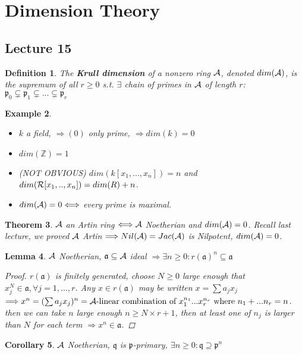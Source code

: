 \documentclass[11pt]{article}
\newtheorem{thm}{Theorem}[section]
\newtheorem{lemma}[thm]{Lemma}
\newtheorem{cor}[thm]{Corollary}
\newtheorem{dfn}[thm]{Definition}
\newtheorem{ex}[thm]{Example}
\newcommand{\intg}{\mathbb Z}
\newcommand{\sca}{{\mathfrak a}}
\newcommand{\scp}{{\mathfrak p}}
\newcommand{\scq}{\mathfrak q}
\newcommand{\cala}{{\cal A}}
\newcommand{\calr}{{\cal R}}
\newcommand{\Lrta}{\Longrightarrow}
\newcommand{\Llrta}{\Longleftrightarrow}
\begin{document}
\section{Dimension Theory}

\subsection{Lecture 15}
\begin{dfn}
The \textbf{Krull dimension} of a nonzero ring $\cala$, denoted $dim(\cala)$, is the supremum of all $r\geq 0$ s.t. $\exists$ chain of primes in $\cala$ of length $r$: 
$\scp_0\subsetneq \scp_1\subsetneq...\subsetneq \scp_r$
\end{dfn}

\begin{ex}\ 
\begin{itemize}
\item $k$ a field, $\Lrta (0)$ only prime, $\Lrta dim(k)=0$
\item $dim(\intg)=1$
\item (NOT OBVIOUS) $dim(k[x_1,...,x_n])=n$
 and $dim(\calr[x_1,..,x_n])=dim(R)+n$.
\item $dim(\cala)=0\Llrta $ every prime is maximal.  
\end{itemize}
\end{ex}

\begin{thm}\label{thm:Artin_equiv_Noetherin+dim=0}
$\cala$ an Artin ring $\Llrta\cala$ Noetherian and $dim(\cala)=0$. Recall last lecture, we proved $\cala$ Artin $\Lrta Nil(\cala)=Jac(\cala)$ is Nilpotent, $dim(\cala)=0$. 
\end{thm}

\begin{lemma}\label{lem:ideal_radical_Noetherian}
$\cala$ Noetherian, $\sca\subseteq \cala$ ideal $\Lrta \exists n\geq 0: r(\sca)^n\subseteq \sca$
\begin{proof}
$r(\sca)$ is finitely generated, choose $N\geq 0$ large enough that $x_j^N\in\sca,\forall j=1,...,r$. Any $x\in r(\sca)$ may be written $x=\sum a_j x_j$ $\Lrta x^n=(\sum a_j x_j)^n=\cala\text{-linear combination of $x_1^{n_1}...x_r^{n_r} $ where $n_1+...n_r=n$}$. then we can take $n$ large enough $n\geq N\times r+1$, then at least one of $n_j$ is larger than $N$ for each term $\Lrta x^n\in\sca$.
\end{proof}
\end{lemma}

\begin{cor}
$\cala$ Noetherian, $\scq$  is $\scp$-primary, $\exists n\geq 0:\scq\supseteq \scp^n$
\end{cor}
\end{document}
